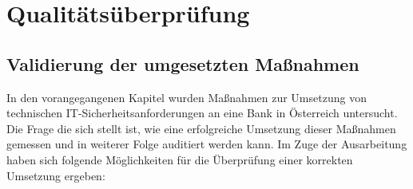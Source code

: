 \setlength{\parindent}{0em} 

\chapter{Qualitätsüberprüfung}
\section{Validierung der umgesetzten Maßnahmen}
In den vorangegangenen Kapitel wurden Maßnahmen zur Umsetzung von technischen IT-Sicherheitsanforderungen an eine Bank in Österreich untersucht. Die Frage die sich stellt ist, wie eine erfolgreiche Umsetzung dieser Maßnahmen gemessen und in weiterer Folge auditiert werden kann. 
\bigbreak
Im Zuge der Ausarbeitung haben sich folgende Möglichkeiten für die Überprüfung einer korrekten Umsetzung ergeben:
